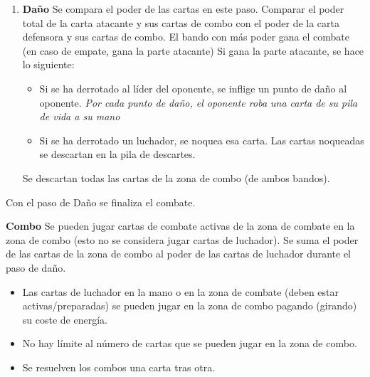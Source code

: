 \documentclass[10pt,a4paper]{article}
\begin{document}
\begin{shaded}
\begin{enumerate}
    \item \textbf{Daño} \newline
    Se compara el poder de las cartas en este paso. \newline
    Comparar el poder total de la carta atacante y sus cartas de combo con el poder de la carta defensora y sus cartas de combo.
    El bando con más poder gana el combate (en caso de empate, gana la parte atacante) \newline
    Si gana la parte atacante, se hace lo siguiente:
    \begin{itemize}
      \item Si se ha derrotado al líder del oponente, se inflige un punto de daño al oponente. \newline
            \emph{Por cada punto de daño, el oponente roba una carta de su pila de vida a su mano}
      \item Si se ha derrotado un luchador, se noquea esa carta.
            Las cartas noqueadas se descartan en la pila de descartes.
    \end{itemize}

    Se descartan todas las cartas de la zona de combo (de ambos bandos).
  \end{enumerate}

  Con el paso de Daño se finaliza el combate.
\end{shaded}

\begin{shaded}
  \textbf{Combo} \newline
  Se pueden jugar cartas de combate activas de la zona de combate en la zona de combo (esto no se considera jugar cartas de luchador). \newline
  Se suma el poder de las cartas de la zona de combo al poder de las cartas de luchador durante el paso de daño.
  \begin{itemize}
    \item Las cartas de luchador en la mano o en la zona de combate (deben estar activas/preparadas) se pueden jugar en la zona de combo pagando (girando) su coste de energía.
    \item No hay límite al número de cartas que se pueden jugar en la zona de combo.
    \item Se resuelven los combos una carta tras otra.
  \end{itemize}
\end{shaded}
\end{document}
